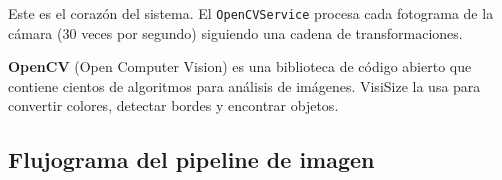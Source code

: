 \documentclass[12pt, a4paper]{article}
\begin{document}
Este es el corazón del sistema. El \texttt{OpenCVService} procesa cada fotograma
de la cámara (30 veces por segundo) siguiendo una cadena de transformaciones.

\begin{infobox}[title=¿Qué es OpenCV?]
\textbf{OpenCV} (Open Computer Vision) es una biblioteca de código abierto
que contiene cientos de algoritmos para análisis de imágenes. VisiSize la
usa para convertir colores, detectar bordes y encontrar objetos.
\end{infobox}

\subsection{Flujograma del pipeline de imagen}

\vspace{0.5cm}
\end{document}
